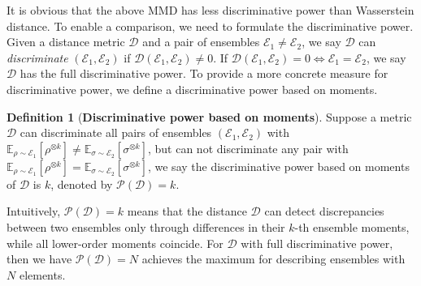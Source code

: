 \documentclass[aps,prx,reprint,superscriptaddress,amsmath,amssymb,longbibliography,floatfix]{revtex4-2}
\newcommand{\dsE}{\mathbb{E}}
\newcommand{\scC}{\mathcal{C}}
\newcommand{\scD}{\mathcal{D}}
\newcommand{\scE}{\mathcal{E}}
\newcommand{\scP}{\mathcal{P}}
\theoremstyle{plain}
\theoremstyle{definition}
\newtheorem{definition}[theorem]{Definition}
\theoremstyle{remark}
\begin{document}
It is obvious that the above MMD has less discriminative power than Wasserstein distance. To enable a comparison, we need to formulate the discriminative power. Given a distance metric $\scD$ and a pair of ensembles $\scE_1 \neq \scE_2$, we say $\scD$ can \emph{discriminate} $(\scE_1, \scE_2)$ if $\scD(\scE_1,\scE_2)\ne0$. If $\scD(\scE_1,\scE_2) = 0 \Longleftrightarrow \scE_1=\scE_2$, we say $\scD$ has the full discriminative power. To provide a more concrete measure for discriminative power, we define a discriminative power based on moments.





\begin{definition}[\textbf{Discriminative power based on moments}]
    Suppose a metric $\scD$ can discriminate all pairs of ensembles $(\scE_1, \scE_2)$ with $\dsE_{\rho\sim\scE_1}[\rho^{\otimes k}] \ne \dsE_{\sigma\sim\scE_2}[\sigma^{\otimes k}]$, but can not discriminate any pair with $\dsE_{\rho\sim\scE_1}[\rho^{\otimes k}] = \dsE_{\sigma\sim\scE_2}[\sigma^{\otimes k}]$, we say the discriminative power based on moments of $\scD$ is $k$, denoted by $\scP(\scD)=k$.\label{def: discriminative power moments}
\end{definition}

Intuitively, $\scP(\scD)=k$ means that the distance $\scD$ can detect discrepancies between two ensembles only through differences in their $k$-th ensemble moments, while all lower-order moments coincide. For $\scD$ with full discriminative power, then we have $\scP(\scD)=N$ achieves the maximum for describing ensembles with $N$ elements.
\end{document}
